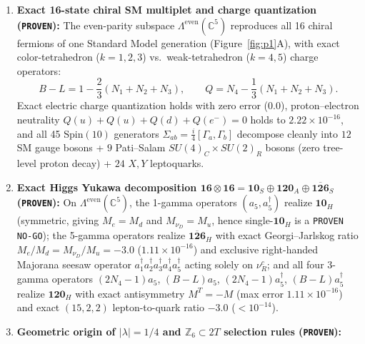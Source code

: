 \documentclass[11pt,a4paper]{article}
\begin{document}
\begin{enumerate}
    \item \textbf{Exact 16-state chiral SM multiplet and charge quantization (\texttt{PROVEN}):} The even-parity subspace $\Lambda^{\mathrm{even}}(\mathbb{C}^5)$ reproduces all 16 chiral fermions of one Standard Model generation (Figure~\ref{fig:p1}A), with exact color-tetrahedron ($k=1,2,3$) vs.\ weak-tetrahedron ($k=4,5$) charge operators:
    \begin{equation}
        B - L = 1 - \frac{2}{3}(N_1 + N_2 + N_3), \qquad Q = N_4 - \frac{1}{3}(N_1 + N_2 + N_3).
        \label{eq:charge-quant}
    \end{equation}
    Exact electric charge quantization holds with zero error ($0.0$), proton--electron neutrality $Q(u)+Q(u)+Q(d)+Q(e^-) = 0$ holds to $2.22\times 10^{-16}$, and all 45 $\mathrm{Spin}(10)$ generators $\Sigma_{ab} = \frac{i}{4}[\Gamma_a, \Gamma_b]$ decompose cleanly into $12$ SM gauge bosons + $9$ Pati--Salam $SU(4)_C\times SU(2)_R$ bosons (zero tree-level proton decay) + $24$ $X,Y$ leptoquarks.
    \item \textbf{Exact Higgs Yukawa decomposition $\mathbf{16}\otimes\mathbf{16} = \mathbf{10}_S \oplus \mathbf{120}_A \oplus \overline{\mathbf{126}}_S$ (\texttt{PROVEN}):}
    On $\Lambda^{\mathrm{even}}(\mathbb{C}^5)$, the 1-gamma operators $(a_5, a_5^\dagger)$ realize $\mathbf{10}_H$ (symmetric, giving $M_e = M_d$ and $M_{\nu_D} = M_u$, hence single-$\mathbf{10}_H$ is a \texttt{PROVEN NO-GO}); the 5-gamma operators realize $\overline{\mathbf{126}}_H$ with exact Georgi--Jarlskog ratio $M_e/M_d = M_{\nu_D}/M_u = -3.0$ ($1.11\times 10^{-16}$) and exclusive right-handed Majorana seesaw operator $a_1^\dagger a_2^\dagger a_3^\dagger a_4^\dagger a_5^\dagger$ acting solely on $\nu_R^c$; and all four 3-gamma operators $(2N_4-1)a_5$, $(B-L)a_5$, $(2N_4-1)a_5^\dagger$, $(B-L)a_5^\dagger$ realize $\mathbf{120}_H$ with exact antisymmetry $M^T = -M$ (max error $1.11\times 10^{-16}$) and exact $(15,2,2)$ lepton-to-quark ratio $-3.0$ ($<10^{-14}$).
    \item \textbf{Geometric origin of $|\lambda| = 1/4$ and $\mathbb{Z}_6 \subset 2T$ selection rules (\texttt{PROVEN}):}

\end{enumerate}
\end{document}
